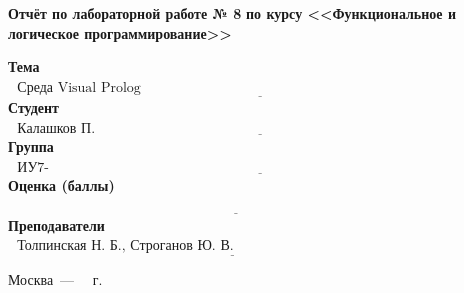\begin{titlepage}
	\begin{center}
		\Large\textbf{Отчёт по лабораторной работе № 8}
		\Large\textbf{по курсу <<Функциональное и логическое программирование>>}
	\end{center}

	\noindent\textbf{Тема} $\underline{\text{~~Среда Visual Prolog ~~~~~~~~~~~~~~~~~~~~~~~~~~~~~~~~~~~~~~~~~~~~~~~~~~~~~~~~~~~~~~~~~~~~~~~~~~~~~~~~~~~~~~}}$\newline\newline
	\noindent\textbf{Студент} $\underline{\text{~~Калашков П. А.~~~~~~~~~~~~~~~~~~~~~~~~~~~~~~~~~~~~~~~~~~~~~~~~~~~~~~~~~~~~~~~~~~~~~~~~~~~~~~~~~~~~~~}}$\newline\newline
	\noindent\textbf{Группа} $\underline{\text{~~ИУ7-66Б~~~~~~~~~~~~~~~~~~~~~~~~~~~~~~~~~~~~~~~~~~~~~~~~~~~~~~~~~~~~~~~~~~~~~~~~~~~~~~~~~~~~~~~~~~~~~~~~~}}$\newline\newline
	\noindent\textbf{Оценка (баллы)} $\underline{\text{~~~~~~~~~~~~~~~~~~~~~~~~~~~~~~~~~~~~~~~~~~~~~~~~~~~~~~~~~~~~~~~~~~~~~~~~~~~~~~~~~~~~~~~~~~~~~~~~~~}}$\newline\newline
	\noindent\textbf{Преподаватели} $\underline{\text{~~Толпинская Н. Б., Строганов Ю. В.~~~~~~~~~~~~~~~~~~~~~~~~~~~~~~~~~~~~~~~~~~~~~~~~}}$\newline

	\begin{center}
		\vfill
		Москва~---~\the\year
		~г.
	\end{center}
	\restoregeometry
\end{titlepage}

